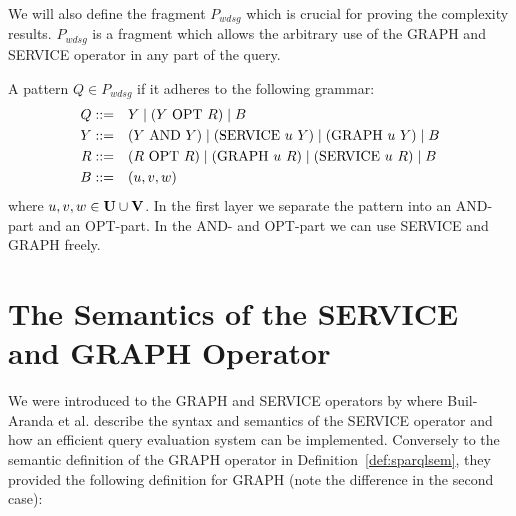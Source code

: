 		We will also define the fragment $P_{wdsg}$ which is crucial for proving the
		complexity results. $P_{wdsg}$ is a fragment which allows the arbitrary use of
		the GRAPH and SERVICE operator in any part of the query.
		\begin{definition}[$P_{wdsg}$]
			A pattern $Q \in P_{wdsg}$ if it adheres to the following grammar:
			\begin{align*}
				Q::= &\quad Y \mid (Y \mbox{ OPT } R)  \mid B \\
				Y::= &\quad (Y \mbox{ AND } Y) \mid (\mbox{SERVICE } u \ Y) \mid (\mbox{GRAPH } u \
				Y) \mid  B\\
				R::= &\quad(R \mbox{ OPT } R) \mid (\mbox{GRAPH } u \ R) \mid (\mbox{SERVICE } u \ R) \mid B  \\
				B::= &\quad(u,v,w)
			\end{align*}
			where	$u,v,w \in \mathbf{U} \cup \mathbf{V}$. In the first layer we separate the pattern
			into an AND-part and an OPT-part. In the AND- and OPT-part we can use
			SERVICE and GRAPH freely.
		\end{definition}

		\section{The Semantics of the SERVICE and GRAPH Operator}
		We were introduced to the GRAPH and
		SERVICE operators by \cite{BuilAranda20131} where Buil-Aranda et al.
		describe the syntax and semantics of the SERVICE operator and how an efficient query
		evaluation system can be implemented. 
		Conversely to the semantic definition of the GRAPH operator in Definition~\ref{def:sparqlsem}, they provided the
		following definition for GRAPH (note the difference in the second case):	


